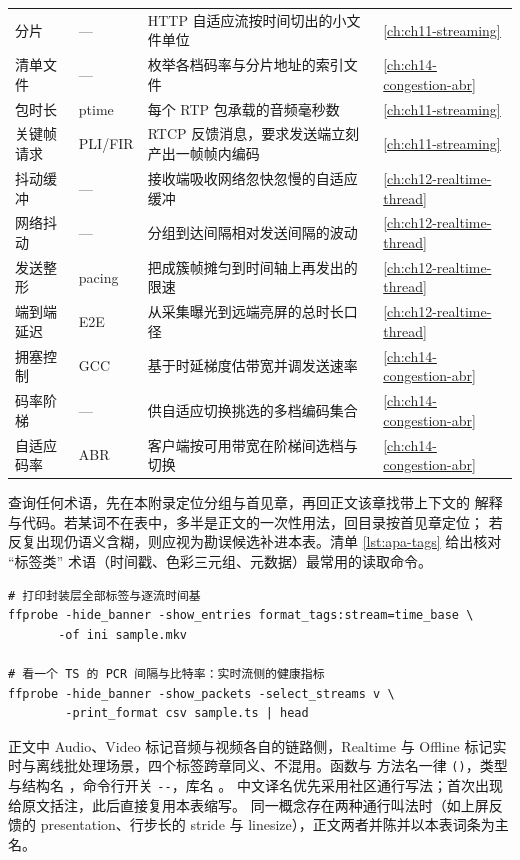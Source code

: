 \documentclass[12pt,a4paper,fontset=fandol]{ctexbook}
\newcommand{\Fn}[1]{\texttt{#1()}}
\newcommand{\Tp}[1]{\texttt{#1}}
\newcommand{\Opt}[1]{\texttt{-\/-#1}}
\newcommand{\Lib}[1]{\textbf{\texttt{#1}}}
\newcommand{\Lang}[1]{\textsf{#1}}
\newcommand{\DomAud}{\Lang{Audio}}
\newcommand{\DomVid}{\Lang{Video}}
\newcommand{\DomRT}{\Lang{Realtime}}
\newcommand{\DomBatch}{\Lang{Offline}}
\begin{document}
\begin{longtable}{>{\raggedright\arraybackslash}p{} >{\raggedright\arraybackslash}p{} >{\raggedright\arraybackslash}p{} >{\raggedright\arraybackslash}p{}}
分片 & — & HTTP 自适应流按时间切出的小文件单位 & \ref{ch:ch11-streaming} \\
清单文件 & — & 枚举各档码率与分片地址的索引文件 & \ref{ch:ch14-congestion-abr} \\
包时长 & ptime & 每个 RTP 包承载的音频毫秒数 & \ref{ch:ch11-streaming} \\
关键帧请求 & PLI/FIR & RTCP 反馈消息，要求发送端立刻产出一帧帧内编码 & \ref{ch:ch11-streaming} \\
抖动缓冲 & — & 接收端吸收网络忽快忽慢的自适应缓冲 & \ref{ch:ch12-realtime-thread} \\
网络抖动 & — & 分组到达间隔相对发送间隔的波动 & \ref{ch:ch12-realtime-thread} \\
发送整形 & pacing & 把成簇帧摊匀到时间轴上再发出的限速 & \ref{ch:ch12-realtime-thread} \\
端到端延迟 & E2E & 从采集曝光到远端亮屏的总时长口径 & \ref{ch:ch12-realtime-thread} \\
拥塞控制 & GCC & 基于时延梯度估带宽并调发送速率 & \ref{ch:ch14-congestion-abr} \\
码率阶梯 & — & 供自适应切换挑选的多档编码集合 & \ref{ch:ch14-congestion-abr} \\
自适应码率 & ABR & 客户端按可用带宽在阶梯间选档与切换 & \ref{ch:ch14-congestion-abr} \\
\end{longtable}

查询任何术语，先在本附录定位分组与首见章，再回正文该章找带上下文的
解释与代码。若某词不在表中，多半是正文的一次性用法，回目录按首见章定位；
若反复出现仍语义含糊，则应视为勘误候选补进本表。清单 \ref{lst:apa-tags}
给出核对 ``标签类'' 术语（时间戳、色彩三元组、元数据）最常用的读取命令。

\begin{lstlisting}[style=shellstyle,caption={读取文件的时间戳与元数据标签，与术语表逐条对照},label={lst:apa-tags}]
# 打印封装层全部标签与逐流时间基
ffprobe -hide_banner -show_entries format_tags:stream=time_base \
       -of ini sample.mkv

# 看一个 TS 的 PCR 间隔与比特率：实时流侧的健康指标
ffprobe -hide_banner -show_packets -select_streams v \
        -print_format csv sample.ts | head
\end{lstlisting}

\begin{guideline}[title={本册用词约定}]
正文中 \DomAud{}、\DomVid{} 标记音频与视频各自的链路侧，\DomRT{} 与
\DomBatch{} 标记实时与离线批处理场景，四个标签跨章同义、不混用。函数与
方法名一律 \Fn{}，类型与结构名 \Tp{}，命令行开关 \Opt{}，库名 \Lib{}。
中文译名优先采用社区通行写法；首次出现给原文括注，此后直接复用本表缩写。
同一概念存在两种通行叫法时（如上屏反馈的 presentation、行步长的 stride
与 linesize），正文两者并陈并以本表词条为主名。
\end{guideline}
\end{document}
